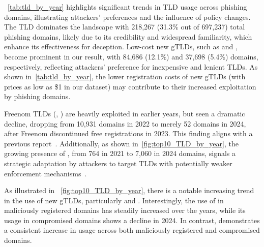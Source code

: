 ~\autoref{tab:tld_by_year} highlights significant trends in TLD usage across phishing domains, illustrating attackers’ preferences and the influence of policy changes. 
The  TLD dominates the landscape with 218,267 (31.3\% out of 697,237) total phishing domains, likely due to its credibility and widespread familiarity, which enhance its effectiveness for deception. 
Low-cost new gTLDs, such as  and , become prominent in our result, with 84,686 (12.1\%) and 37,698 (5.4\%) domains, respectively, reflecting attackers’ preference for inexpensive and lenient TLDs. 
As shown in~\autoref{tab:tld_by_year}, the lower registration costs of new gTLDs (with prices as low as \$1 in our dataset) may contribute to their increased exploitation by phishing domains.

Freenom TLDs (\eg, ) are heavily exploited in earlier years, but seen a dramatic decline, dropping from 10,931 domains in 2022 to merely 52 domains in 2024, after Freenom discontinued free registrations in 2023.
This finding aligns with a previous report~\cite{Phishing18:online}.
Additionally, as shown in~\autoref{fig:top10_TLD_by_year}, the growing presence of , from 764 in 2021 to 7,060 in 2024 domains, signals a strategic adaptation by attackers to target TLDs with potentially weaker enforcement mechanisms~\cite{Phishing18:online}.

As illustrated in ~\autoref{fig:top10_TLD_by_year}, there is a notable increasing trend in the use of new gTLDs, particularly  and . 
Interestingly, the use of  in maliciously registered domains has steadily increased over the years, while its usage in compromised domains shows a decline in 2024. 
In contrast,  demonstrates a consistent increase in usage across both maliciously registered and compromised domains.

